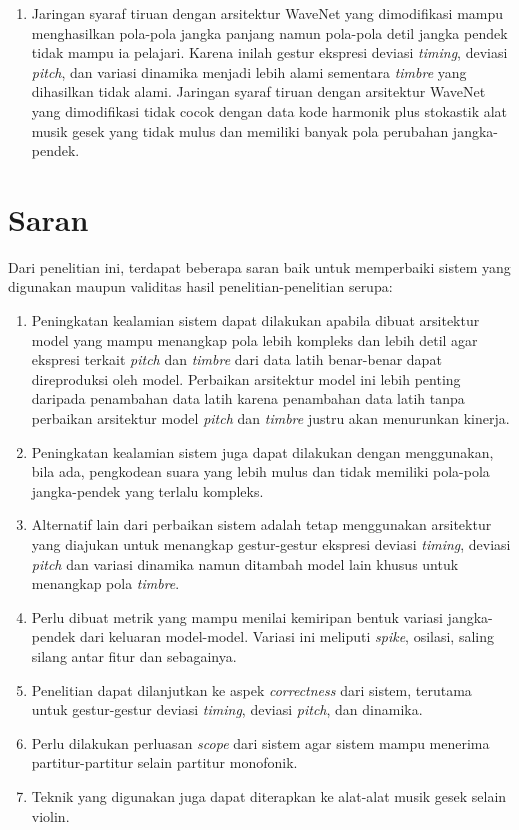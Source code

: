 \begin{enumerate}
\item Jaringan syaraf tiruan dengan arsitektur WaveNet yang dimodifikasi mampu menghasilkan pola-pola jangka panjang namun pola-pola detil jangka pendek tidak mampu ia pelajari. Karena inilah gestur ekspresi deviasi \textit{timing}, deviasi \textit{pitch}, dan variasi dinamika menjadi lebih alami sementara \textit{timbre} yang dihasilkan tidak alami. Jaringan syaraf tiruan dengan arsitektur WaveNet yang dimodifikasi tidak cocok dengan data kode harmonik plus stokastik alat musik gesek yang tidak mulus dan memiliki banyak pola perubahan jangka-pendek.

\end{enumerate}

\section{Saran}

Dari penelitian ini, terdapat beberapa saran baik untuk memperbaiki sistem yang digunakan maupun validitas hasil penelitian-penelitian serupa:
\begin{enumerate}
	\item Peningkatan kealamian sistem dapat dilakukan apabila dibuat arsitektur model yang mampu menangkap pola lebih kompleks dan lebih detil agar ekspresi terkait \textit{pitch} dan \textit{timbre} dari data latih benar-benar dapat direproduksi oleh model. Perbaikan arsitektur model ini lebih penting daripada penambahan data latih karena penambahan data latih tanpa perbaikan arsitektur model \textit{pitch} dan \textit{timbre} justru akan menurunkan kinerja.
	\item Peningkatan kealamian sistem juga dapat dilakukan dengan menggunakan, bila ada, pengkodean suara yang lebih mulus dan tidak memiliki pola-pola jangka-pendek yang terlalu kompleks.
	\item Alternatif lain dari perbaikan sistem adalah tetap menggunakan arsitektur yang diajukan untuk menangkap gestur-gestur ekspresi deviasi \textit{timing}, deviasi \textit{pitch} dan variasi dinamika namun ditambah model lain khusus untuk menangkap pola \textit{timbre}.
	\item Perlu dibuat metrik yang mampu menilai kemiripan bentuk variasi jangka-pendek dari keluaran model-model. Variasi ini meliputi \textit{spike}, osilasi, saling silang antar fitur dan sebagainya.
	\item Penelitian dapat dilanjutkan ke aspek \textit{correctness} dari sistem, terutama untuk gestur-gestur deviasi \textit{timing}, deviasi \textit{pitch}, dan dinamika.
	\item Perlu dilakukan perluasan \textit{scope} dari sistem agar sistem mampu menerima partitur-partitur selain partitur monofonik.
	\item Teknik yang digunakan juga dapat diterapkan ke alat-alat musik gesek selain violin.
\end{enumerate}